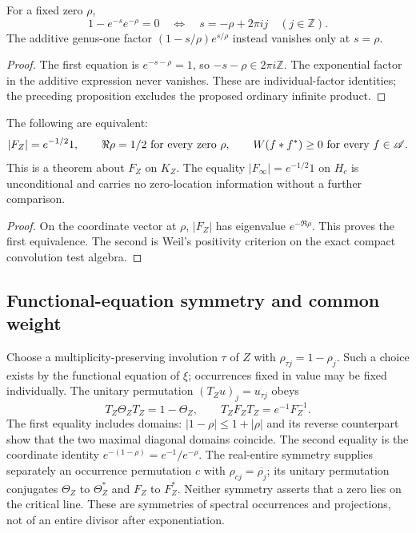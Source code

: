 \begin{proposition}
\label{v4-arith:w9-r2:cor:character-factorisation}
For a fixed zero \(\rho\),
\[
 1-e^{-s}e^{-\rho}=0
 \quad\Longleftrightarrow\quad
 s=-\rho+2\pi i j\quad(j\in\mathbb Z).
\]
The additive genus-one factor \((1-s/\rho)e^{s/\rho}\) instead
vanishes only at \(s=\rho\).
\end{proposition}
\begin{proof}
The first equation is \(e^{-s-\rho}=1\), so
\(-s-\rho\in2\pi i\mathbb Z\). The exponential factor in the additive
expression never vanishes. These are individual-factor identities;
the preceding proposition excludes the proposed ordinary infinite product.
\end{proof}

\begin{theorem}
\label{v4-arith:w9-r2:thm:purity-ATP-RH}
The following are equivalent:
\[
 |F_Z|=e^{-1/2}1,
 \qquad \Re\rho=1/2\ \hbox{for every zero }\rho,
 \qquad W(f*f^*)\ge0\ \hbox{for every }f\in\mathscr A.
\]
This is a theorem about $F_Z$ on $K_Z$.
The equality $|F_\infty|=e^{-1/2}1$ on $H_c$ is unconditional and
carries no zero-location information without a further comparison.
\end{theorem}
\begin{proof}
On the coordinate vector at $\rho$, $|F_Z|$ has eigenvalue
$e^{-\Re\rho}$. This proves the first equivalence.
The second is Weil's positivity criterion on the exact compact
convolution test algebra.
\end{proof}

\subsection{Functional-equation symmetry and common weight}
\label{v4-arith:pres90:occurrence-symmetry}

Choose a multiplicity-preserving involution $\tau$ of $Z$ with
$\rho_{\tau j}=1-\rho_j$. Such a choice exists by the functional
equation of $\xi$; occurrences fixed in value may be fixed individually.
The unitary permutation $(T_Zu)_j=u_{\tau j}$ obeys
\[
 T_Z\Theta_ZT_Z=1-\Theta_Z,\qquad
 T_ZF_ZT_Z=e^{-1}F_Z^{-1}.
\]
The first equality includes domains: $|1-\rho|\le1+|\rho|$ and
its reverse counterpart show that the two maximal diagonal domains
coincide. The second equality is the coordinate identity
$e^{-(1-\rho)}=e^{-1}/e^{-\rho}$.
The real-entire symmetry supplies separately an occurrence permutation
$c$ with $\rho_{cj}=\overline{\rho_j}$; its unitary permutation
conjugates $\Theta_Z$ to $\Theta_Z^*$ and $F_Z$ to $F_Z^*$.
Neither symmetry asserts that a zero lies on the critical line.
These are symmetries of spectral occurrences and projections, not
of an entire divisor after exponentiation.

